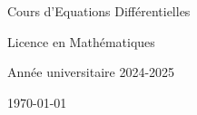 \begin{titlepage}
    \centering
    \vspace*{1cm}

    \Huge
    Cours d'Equations Différentielles

    \vspace{0.5cm}

    \LARGE
    Licence en Mathématiques

    \vspace{1.5cm}


    \vfill

    \Large
    Année universitaire 2024-2025

    \vspace{0.8cm}

    \today
\end{titlepage}
